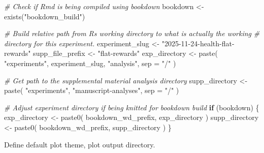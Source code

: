 \documentclass[
]{book}
\newenvironment{Shaded}{\begin{snugshade}}{\end{snugshade}}
\newcommand{\AttributeTok}[1]{\textcolor[rgb]{0.77,0.63,0.00}{#1}}
\newcommand{\CommentTok}[1]{\textcolor[rgb]{0.56,0.35,0.01}{\textit{#1}}}
\newcommand{\ControlFlowTok}[1]{\textcolor[rgb]{0.13,0.29,0.53}{\textbf{#1}}}
\newcommand{\FunctionTok}[1]{\textcolor[rgb]{0.00,0.00,0.00}{#1}}
\newcommand{\NormalTok}[1]{#1}
\newcommand{\OtherTok}[1]{\textcolor[rgb]{0.56,0.35,0.01}{#1}}
\newcommand{\StringTok}[1]{\textcolor[rgb]{0.31,0.60,0.02}{#1}}
\begin{document}
\begin{Shaded}
\begin{Highlighting}[]
\CommentTok{\# Check if Rmd is being compiled using bookdown}
\NormalTok{bookdown }\OtherTok{\textless{}{-}} \FunctionTok{exists}\NormalTok{(}\StringTok{"bookdown\_build"}\NormalTok{)}

\CommentTok{\# Build relative path from R\textquotesingle{}s working directory to what is actually the working}
\CommentTok{\# directory for this experiment.}
\NormalTok{experiment\_slug }\OtherTok{\textless{}{-}} \StringTok{"2025{-}11{-}24{-}health{-}flat{-}rewards"}
\NormalTok{supp\_file\_prefix }\OtherTok{\textless{}{-}} \StringTok{"flat{-}rewards"}
\NormalTok{exp\_directory }\OtherTok{\textless{}{-}} \FunctionTok{paste}\NormalTok{(}
  \StringTok{"experiments"}\NormalTok{,}
\NormalTok{  experiment\_slug,}
  \StringTok{"analysis"}\NormalTok{,}
  \AttributeTok{sep =} \StringTok{"/"}
\NormalTok{)}

\CommentTok{\# Get path to the supplemental material analysis directory}
\NormalTok{supp\_directory }\OtherTok{\textless{}{-}} \FunctionTok{paste}\NormalTok{(}
  \StringTok{"experiments"}\NormalTok{,}
  \StringTok{"manuscript{-}analyses"}\NormalTok{,}
  \AttributeTok{sep =} \StringTok{"/"}
\NormalTok{)}

\CommentTok{\# Adjust experiment directory if being knitted for bookdown build}
\ControlFlowTok{if}\NormalTok{ (bookdown) \{}
\NormalTok{  exp\_directory }\OtherTok{\textless{}{-}} \FunctionTok{paste0}\NormalTok{(}
\NormalTok{    bookdown\_wd\_prefix,}
\NormalTok{    exp\_directory}
\NormalTok{  )}
\NormalTok{  supp\_directory }\OtherTok{\textless{}{-}} \FunctionTok{paste0}\NormalTok{(}
\NormalTok{    bookdown\_wd\_prefix,}
\NormalTok{    supp\_directory}
\NormalTok{  )}
\NormalTok{\}}
\end{Highlighting}
\end{Shaded}

Define default plot theme, plot output directory.
\end{document}
